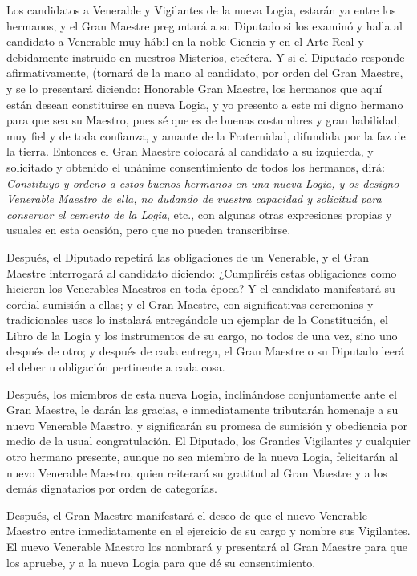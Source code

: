 \documentclass[a4paper,12pt,twoside]{book}
\begin{document}
Los candidatos a Venerable y Vigilantes de la nueva Logia, estarán ya entre los hermanos, y el Gran Maestre preguntará a su Diputado si los examinó y halla al candidato a Venerable muy hábil en la noble Ciencia y en el Arte Real y debidamente instruido en nuestros Misterios, etcétera. Y si el Diputado responde afirmativamente, (tornará de la mano al candidato, por orden del Gran Maestre, y se lo presentará diciendo: Honorable Gran Maestre, los hermanos que aquí están desean constituirse en nueva Logia, y yo presento a este mi digno hermano para que sea su Maestro, pues sé que es de buenas costumbres y gran habilidad, muy fiel y de toda confianza, y amante de la Fraternidad, difundida por la faz de la tierra. Entonces el Gran Maestre colocará al candidato a su izquierda, y solicitado y obtenido el unánime consentimiento de todos los hermanos, dirá: \textit{Constituyo y ordeno a estos buenos hermanos en una nueva Logia, y os designo Venerable Maestro de ella, no dudando de vuestra capacidad y solicitud para conservar el cemento de la Logia}, etc., con algunas otras expresiones propias y usuales en esta ocasión, pero que no pueden transcribirse.

Después, el Diputado repetirá las obligaciones de un Venerable, y el Gran Maestre interrogará al candidato diciendo: ¿Cumpliréis estas obligaciones como hicieron los Venerables Maestros en toda época? Y el candidato manifestará su cordial sumisión a ellas; y el Gran Maestre, con significativas ceremonias y tradicionales usos lo instalará entregándole un ejemplar de la Constitución, el Libro de la Logia y los instrumentos de su cargo, no todos de una vez, sino uno después de otro; y después de cada entrega, el Gran Maestre o su Diputado leerá el deber u obligación pertinente a cada cosa.

Después, los miembros de esta nueva Logia, inclinándose conjuntamente ante el Gran Maestre, le darán las gracias, e inmediatamente tributarán homenaje a su nuevo Venerable Maestro, y significarán su promesa de sumisión y obediencia por medio de la usual congratulación. El Diputado, los Grandes Vigilantes y cualquier otro hermano presente, aunque no sea miembro de la nueva Logia, felicitarán al nuevo Venerable Maestro, quien reiterará su gratitud al Gran Maestre y a los demás dignatarios por orden de categorías.

Después, el Gran Maestre manifestará el deseo de que el nuevo Venerable Maestro entre inmediatamente en el ejercicio de su cargo y nombre sus Vigilantes. El nuevo Venerable Maestro los nombrará y presentará al Gran Maestre para que los apruebe, y a la nueva Logia para que dé su consentimiento.
\end{document}
